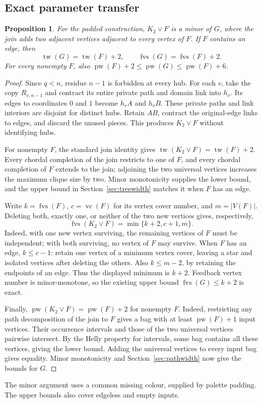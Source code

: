 \documentclass[11pt]{article}
\newtheorem{proposition}[theorem]{Proposition}
\theoremstyle{remark}
\DeclareMathOperator{\tw}{tw}
\DeclareMathOperator{\pw}{pw}
\DeclareMathOperator{\fvs}{fvs}
\begin{document}
\subsection{Exact parameter transfer}
\begin{proposition}\label{prop:exact}
For the padded construction, $K_2\vee F$ is a minor of $G$, where the join
adds two adjacent vertices adjacent to every vertex of $F$.
If $F$ contains an edge, then
\[
 \tw(G)=\tw(F)+2,\qquad \fvs(G)=\fvs(F)+2.
\]
For every nonempty $F$, also $\pw(F)+2\leq\pw(G)\leq\pw(F)+6$.
\end{proposition}
\begin{proof}
Since $q<n$, residue $n-1$ is forbidden at every hub. For each $v$, take
the copy $R_{v,n-1}$ and contract its entire private path and domain link
into $h_v$. Its edges to coordinates $0$ and $1$ become $h_vA$ and $h_vB$.
These private paths and link interiors are disjoint for distinct hubs.
Retain $AB$, contract the original-edge links to edges, and discard the
unused pieces. This produces $K_2\vee F$ without identifying hubs.

For nonempty $F$, the standard join identity gives
$\tw(K_2\vee F)=\tw(F)+2$. Every chordal completion of the join restricts
to one of $F$, and every chordal completion of $F$ extends to the join;
adjoining the two universal vertices increases the maximum clique size by two.
Minor monotonicity supplies the lower bound,
and the upper bound in Section~\ref{sec:treewidth} matches it when $F$
has an edge.

Write $k=\fvs(F)$, $c=\operatorname{vc}(F)$ for its vertex cover number,
and $m=|V(F)|$. Deleting both, exactly one, or neither of the two new
vertices gives, respectively,
\[
 \fvs(K_2\vee F)=\min\{k+2,c+1,m\}.
\]
Indeed, with one new vertex surviving, the remaining vertices of $F$
must be independent; with both surviving, no vertex of $F$ may survive.
When $F$ has an edge, $k\leq c-1$: retain one vertex of a minimum vertex
cover, leaving a star and isolated vertices after deleting the others.
Also $k\leq m-2$, by retaining the endpoints of an edge. Thus the displayed
minimum is $k+2$. Feedback vertex number is minor-monotone, so the existing
upper bound $\fvs(G)\leq k+2$ is exact.

Finally, $\pw(K_2\vee F)=\pw(F)+2$ for nonempty $F$.
Indeed, restricting any path decomposition of the join to $F$ gives a bag
with at least $\pw(F)+1$ input vertices. Their occurrence intervals and
those of the two universal vertices pairwise intersect. By the Helly
property for intervals, some bag contains all these vertices, giving the
lower bound. Adding the universal vertices to every input bag gives equality.
Minor monotonicity and Section~\ref{sec:pathwidth} now give the bounds for $G$.
\end{proof}
The minor argument uses a common missing colour, supplied by palette padding.
The upper bounds also cover edgeless and empty inputs.
\end{document}
